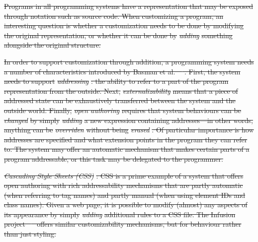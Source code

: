 \documentclass[english,submission]{programming}
\providecommand{\DIFdel}[1]{{\protect\color{red}\sout{#1}}}                      %
\begin{document}
\DIFdel{Programs in all programming systems have a representation that may be
exposed through notation such as source code. When customizing a
program, an interesting question is whether a customization needs to be
done by modifying the original representation, or whether it can be done
by }\emph{\DIFdel{adding}} %
\DIFdel{something alongside the original structure.
}%

\DIFdel{In order to support customization through addition, a programming system
needs a number of characteristics introduced by Basman et
al.~\mbox{%
\cite{Externalize,OpenAuthorial}}\hspace{0pt}%
. First, the system needs to support
}\emph{\DIFdel{addressing}}%
\DIFdel{: the ability to refer to a part of the program
representation from the outside. Next, }\emph{\DIFdel{externalizability}} %
\DIFdel{means
that a piece of addressed state can be exhaustively transferred between
the system and the outside world. Finally, }\emph{\DIFdel{open authoring}}
\DIFdel{requires that system behaviours can be }\emph{\DIFdel{changed}} %
\DIFdel{by simply
}\emph{\DIFdel{adding}} %
\DIFdel{a new expression containing addresses---in other words,
anything can be }\emph{\DIFdel{overriden}} %
\DIFdel{without being }\emph{\DIFdel{erased}}%
\DIFdel{. Of
particular importance is how addresses are specified and what extension
points in the program they can refer to. The system may offer an
automatic mechanism that makes certain parts of a program addressable,
or this task may be delegated to the programmer.
}%

\emph{\DIFdel{Cascading Style Sheets (CSS)}}%
\DIFdel{: CSS is a prime example of a system
that offers open authoring with rich addressability mechanisms that are
partly automatic (when referring to tag names) and partly manual (when
using element IDs and class names). Given a web page, it is possible to
modify (almost) any aspects of its appearance by simply }\emph{\DIFdel{adding}}
\DIFdel{additional rules to a CSS file. The Infusion project \mbox{%
\cite{Infusion}
}\hspace{0pt}%
offers similar customizability mechanisms, but for behaviour rather than
just styling.
}%
\end{document}
